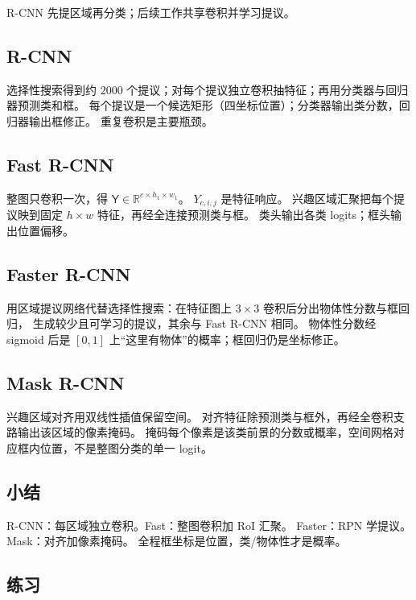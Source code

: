 

R-CNN 先提区域再分类；后续工作共享卷积并学习提议。

\subsection{R-CNN}

选择性搜索得到约 $2000$ 个提议；对每个提议独立卷积抽特征；再用分类器与回归器预测类和框。
每个提议是一个候选矩形（四坐标位置）；分类器输出类分数，回归器输出框修正。
重复卷积是主要瓶颈。

\subsection{Fast R-CNN}

整图只卷积一次，得 $\mathsf{Y}\in\mathbb{R}^{c\times h_1\times w_1}$。
$Y_{c,i,j}$ 是特征响应。
兴趣区域汇聚把每个提议映到固定 $h\times w$ 特征，再经全连接预测类与框。
类头输出各类 logits；框头输出位置偏移。

\subsection{Faster R-CNN}

用区域提议网络代替选择性搜索：在特征图上 $3\times 3$ 卷积后分出物体性分数与框回归，
生成较少且可学习的提议，其余与 Fast R-CNN 相同。
物体性分数经 sigmoid 后是 $[0,1]$ 上“这里有物体”的概率；框回归仍是坐标修正。

\subsection{Mask R-CNN}

兴趣区域对齐用双线性插值保留空间。
对齐特征除预测类与框外，再经全卷积支路输出该区域的像素掩码。
掩码每个像素是该类前景的分数或概率，空间网格对应框内位置，不是整图分类的单一 logit。

\subsection{小结}

R-CNN：每区域独立卷积。Fast：整图卷积加 RoI 汇聚。
Faster：RPN 学提议。Mask：对齐加像素掩码。
全程框坐标是位置，类/物体性才是概率。

\subsection{练习}

